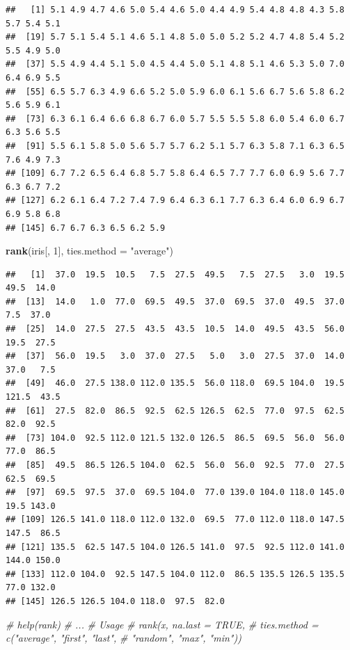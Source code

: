 \documentclass[
]{book}
\newenvironment{Shaded}{\begin{snugshade}}{\end{snugshade}}
\newcommand{\CommentTok}[1]{\textcolor[rgb]{0.56,0.35,0.01}{\textit{#1}}}
\newcommand{\DataTypeTok}[1]{\textcolor[rgb]{0.13,0.29,0.53}{#1}}
\newcommand{\DecValTok}[1]{\textcolor[rgb]{0.00,0.00,0.81}{#1}}
\newcommand{\KeywordTok}[1]{\textcolor[rgb]{0.13,0.29,0.53}{\textbf{#1}}}
\newcommand{\NormalTok}[1]{#1}
\newcommand{\StringTok}[1]{\textcolor[rgb]{0.31,0.60,0.02}{#1}}
\begin{document}
\begin{verbatim}
##   [1] 5.1 4.9 4.7 4.6 5.0 5.4 4.6 5.0 4.4 4.9 5.4 4.8 4.8 4.3 5.8 5.7 5.4 5.1
##  [19] 5.7 5.1 5.4 5.1 4.6 5.1 4.8 5.0 5.0 5.2 5.2 4.7 4.8 5.4 5.2 5.5 4.9 5.0
##  [37] 5.5 4.9 4.4 5.1 5.0 4.5 4.4 5.0 5.1 4.8 5.1 4.6 5.3 5.0 7.0 6.4 6.9 5.5
##  [55] 6.5 5.7 6.3 4.9 6.6 5.2 5.0 5.9 6.0 6.1 5.6 6.7 5.6 5.8 6.2 5.6 5.9 6.1
##  [73] 6.3 6.1 6.4 6.6 6.8 6.7 6.0 5.7 5.5 5.5 5.8 6.0 5.4 6.0 6.7 6.3 5.6 5.5
##  [91] 5.5 6.1 5.8 5.0 5.6 5.7 5.7 6.2 5.1 5.7 6.3 5.8 7.1 6.3 6.5 7.6 4.9 7.3
## [109] 6.7 7.2 6.5 6.4 6.8 5.7 5.8 6.4 6.5 7.7 7.7 6.0 6.9 5.6 7.7 6.3 6.7 7.2
## [127] 6.2 6.1 6.4 7.2 7.4 7.9 6.4 6.3 6.1 7.7 6.3 6.4 6.0 6.9 6.7 6.9 5.8 6.8
## [145] 6.7 6.7 6.3 6.5 6.2 5.9
\end{verbatim}

\begin{Shaded}
\begin{Highlighting}[]
\KeywordTok{rank}\NormalTok{(iris[, }\DecValTok{1}\NormalTok{], }\DataTypeTok{ties.method =} \StringTok{"average"}\NormalTok{)}
\end{Highlighting}
\end{Shaded}

\begin{verbatim}
##   [1]  37.0  19.5  10.5   7.5  27.5  49.5   7.5  27.5   3.0  19.5  49.5  14.0
##  [13]  14.0   1.0  77.0  69.5  49.5  37.0  69.5  37.0  49.5  37.0   7.5  37.0
##  [25]  14.0  27.5  27.5  43.5  43.5  10.5  14.0  49.5  43.5  56.0  19.5  27.5
##  [37]  56.0  19.5   3.0  37.0  27.5   5.0   3.0  27.5  37.0  14.0  37.0   7.5
##  [49]  46.0  27.5 138.0 112.0 135.5  56.0 118.0  69.5 104.0  19.5 121.5  43.5
##  [61]  27.5  82.0  86.5  92.5  62.5 126.5  62.5  77.0  97.5  62.5  82.0  92.5
##  [73] 104.0  92.5 112.0 121.5 132.0 126.5  86.5  69.5  56.0  56.0  77.0  86.5
##  [85]  49.5  86.5 126.5 104.0  62.5  56.0  56.0  92.5  77.0  27.5  62.5  69.5
##  [97]  69.5  97.5  37.0  69.5 104.0  77.0 139.0 104.0 118.0 145.0  19.5 143.0
## [109] 126.5 141.0 118.0 112.0 132.0  69.5  77.0 112.0 118.0 147.5 147.5  86.5
## [121] 135.5  62.5 147.5 104.0 126.5 141.0  97.5  92.5 112.0 141.0 144.0 150.0
## [133] 112.0 104.0  92.5 147.5 104.0 112.0  86.5 135.5 126.5 135.5  77.0 132.0
## [145] 126.5 126.5 104.0 118.0  97.5  82.0
\end{verbatim}

\begin{Shaded}
\begin{Highlighting}[]
\CommentTok{# help(rank)}
\CommentTok{# ...}
\CommentTok{# Usage}
\CommentTok{# rank(x, na.last = TRUE,}
\CommentTok{#     ties.method = c("average", "first", "last", }
\CommentTok{#       "random", "max", "min"))}
\end{Highlighting}
\end{Shaded}
\end{document}
